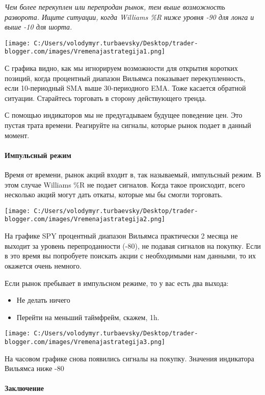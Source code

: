 \documentclass[a5paper]{article}
\begin{document}
\emph{Чем более перекуплен или перепродан рынок, тем выше возможность
разворота. Ищите ситуации, когда Williams \%R ниже уровня -90 для
лонга и выше -10 для шорта.}

\texttt{[image: C:/Users/volodymyr.turbaevsky/Desktop/trader-blogger.com/images/Vremenajastrategija1.png]}

С графика видно, как мы игнорируем возможности для открытия коротких позиций, когда процентный диапазон Вильямса показывает перекупленность, если 10-периодный SMA выше 30-периодного EMA. Тоже касается обратной ситуации. Старайтесь торговать в сторону действующего тренда.

С помощью индикаторов мы не предугадываем будущее поведение цен. Это
пустая трата времени. Реагируйте на сигналы, которые рынок подает в
данный момент.

\paragraph{Импульсный режим}

Время от времени, рынок акций входит в, так называемый, импульсный
режим. В этом случае Williams \%R не подает сигналов. Когда такое
происходит, всего несколько акций могут дать откаты, которые мы бы
смогли торговать.

\texttt{[image: C:/Users/volodymyr.turbaevsky/Desktop/trader-blogger.com/images/Vremenajastrategija2.png]}

На графике SPY процентный диапазон Вильямса практически 2 месяца не выходит за уровень перепроданности (-80), не подавая сигналов на покупку. Если в это время вы попробуете поискать акции с необходимыми нам данными, то их окажется очень немного.

Если рынок пребывает в импульсном режиме, то у вас есть два выхода:
\begin{itemize}
\item     Не делать ничего
\item     Перейти на меньший таймфрейм, скажем, 1h.
\end{itemize}

\texttt{[image: C:/Users/volodymyr.turbaevsky/Desktop/trader-blogger.com/images/Vremenajastrategija3.png]}

На часовом графике снова появились сигналы на покупку. Значения
индикатора Вильямса ниже -80

\paragraph{Заключение}
\end{document}
